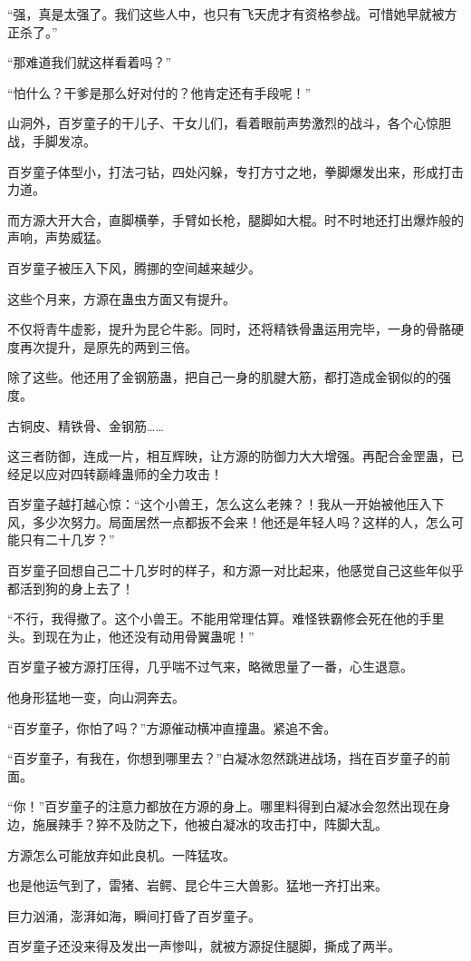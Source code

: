 \begin{this_body}
“强，真是太强了。我们这些人中，也只有飞天虎才有资格参战。可惜她早就被方正杀了。”

“那难道我们就这样看着吗？”

“怕什么？干爹是那么好对付的？他肯定还有手段呢！”

山洞外，百岁童子的干儿子、干女儿们，看着眼前声势激烈的战斗，各个心惊胆战，手脚发凉。

百岁童子体型小，打法刁钻，四处闪躲，专打方寸之地，拳脚爆发出来，形成打击力道。

而方源大开大合，直脚横拳，手臂如长枪，腿脚如大棍。时不时地还打出爆炸般的声响，声势威猛。

百岁童子被压入下风，腾挪的空间越来越少。

这些个月来，方源在蛊虫方面又有提升。

不仅将青牛虚影，提升为昆仑牛影。同时，还将精铁骨蛊运用完毕，一身的骨骼硬度再次提升，是原先的两到三倍。

除了这些。他还用了金钢筋蛊，把自己一身的肌腱大筋，都打造成金钢似的的强度。

古铜皮、精铁骨、金钢筋……

这三者防御，连成一片，相互辉映，让方源的防御力大大增强。再配合金罡蛊，已经足以应对四转巅峰蛊师的全力攻击！

百岁童子越打越心惊：“这个小兽王，怎么这么老辣？！我从一开始被他压入下风，多少次努力。局面居然一点都扳不会来！他还是年轻人吗？这样的人，怎么可能只有二十几岁？”

百岁童子回想自己二十几岁时的样子，和方源一对比起来，他感觉自己这些年似乎都活到狗的身上去了！

“不行，我得撤了。这个小兽王。不能用常理估算。难怪铁霸修会死在他的手里头。到现在为止，他还没有动用骨翼蛊呢！”

百岁童子被方源打压得，几乎喘不过气来，略微思量了一番，心生退意。

他身形猛地一变，向山洞奔去。

“百岁童子，你怕了吗？”方源催动横冲直撞蛊。紧追不舍。

“百岁童子，有我在，你想到哪里去？”白凝冰忽然跳进战场，挡在百岁童子的前面。

“你！”百岁童子的注意力都放在方源的身上。哪里料得到白凝冰会忽然出现在身边，施展辣手？猝不及防之下，他被白凝冰的攻击打中，阵脚大乱。

方源怎么可能放弃如此良机。一阵猛攻。

也是他运气到了，雷猪、岩鳄、昆仑牛三大兽影。猛地一齐打出来。

巨力汹涌，澎湃如海，瞬间打昏了百岁童子。

百岁童子还没来得及发出一声惨叫，就被方源捉住腿脚，撕成了两半。


\end{this_body}
